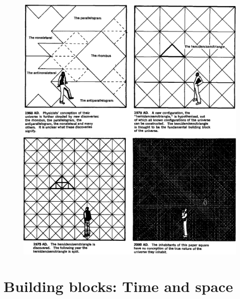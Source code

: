 \documentclass[a4paper,12pt,%
onecolumn,oneside,titlepage,%
british%
]{memoir}
\renewcommand*{\|}[1][]{\nonscript\:#1\vert\nonscript\:\mathopen{}}
\begin{document}
\begin{figure}[p]
  \centering
  \includegraphics[width=1.2\linewidth]{images/chew3.png}
\\[1em]  \includegraphics[width=1.2\linewidth]{images/chew4.png}
  \label{fig:chew2}
\end{figure}



\printpagenotes*
\clearpage
\chapter{Building blocks: Time and space}
\label{cha:time_space}
\end{document}

